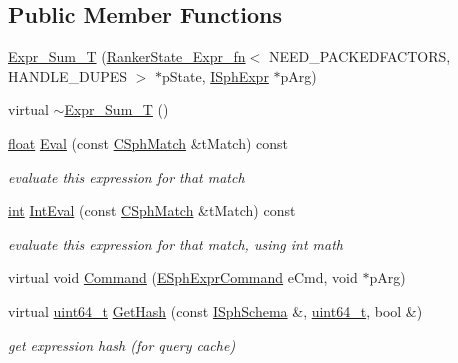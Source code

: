 \subsection*{Public Member Functions}
\begin{DoxyCompactItemize}
\item 
\hyperlink{structExpr__Sum__T_afa6d687f2a369c9534304e3b7fad6c47}{Expr\-\_\-\-Sum\-\_\-\-T} (\hyperlink{structRankerState__Expr__fn}{Ranker\-State\-\_\-\-Expr\-\_\-fn}$<$ N\-E\-E\-D\-\_\-\-P\-A\-C\-K\-E\-D\-F\-A\-C\-T\-O\-R\-S, H\-A\-N\-D\-L\-E\-\_\-\-D\-U\-P\-E\-S $>$ $\ast$p\-State, \hyperlink{structISphExpr}{I\-Sph\-Expr} $\ast$p\-Arg)
\item 
virtual \hyperlink{structExpr__Sum__T_a0acf8c85d7f1afb367dc2927017747fc}{$\sim$\-Expr\-\_\-\-Sum\-\_\-\-T} ()
\item 
\hyperlink{sphinxexpr_8cpp_a0e0d0739f7035f18f949c2db2c6759ec}{float} \hyperlink{structExpr__Sum__T_aa64d6f21e2a812705316267019c512f2}{Eval} (const \hyperlink{classCSphMatch}{C\-Sph\-Match} \&t\-Match) const 
\begin{DoxyCompactList}\small\item\em evaluate this expression for that match \end{DoxyCompactList}\item 
\hyperlink{sphinxexpr_8cpp_a4a26e8f9cb8b736e0c4cbf4d16de985e}{int} \hyperlink{structExpr__Sum__T_a4cc01fb56ff9d4a12dc73744c30425f5}{Int\-Eval} (const \hyperlink{classCSphMatch}{C\-Sph\-Match} \&t\-Match) const 
\begin{DoxyCompactList}\small\item\em evaluate this expression for that match, using int math \end{DoxyCompactList}\item 
virtual void \hyperlink{structExpr__Sum__T_a1b626b0f782823ba0419fb301b4e3261}{Command} (\hyperlink{sphinxexpr_8h_a30be184fb07bd80c271360fc6094c818}{E\-Sph\-Expr\-Command} e\-Cmd, void $\ast$p\-Arg)
\item 
virtual \hyperlink{sphinxstd_8h_aaa5d1cd013383c889537491c3cfd9aad}{uint64\-\_\-t} \hyperlink{structExpr__Sum__T_afed3450b5f10de0bc707a1c9b90442ee}{Get\-Hash} (const \hyperlink{classISphSchema}{I\-Sph\-Schema} \&, \hyperlink{sphinxstd_8h_aaa5d1cd013383c889537491c3cfd9aad}{uint64\-\_\-t}, bool \&)
\begin{DoxyCompactList}\small\item\em get expression hash (for query cache) \end{DoxyCompactList}\end{DoxyCompactItemize}

